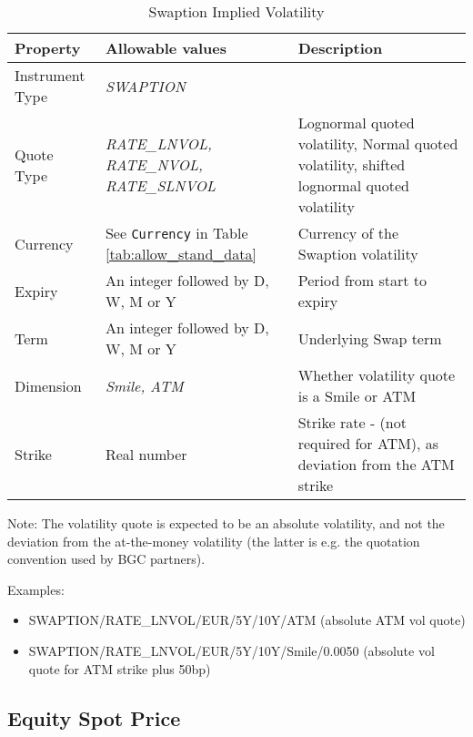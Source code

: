 \begin{table}[H]
\centering
  \begin{tabular}{|p{3cm}|p{3.5cm}|p{7cm}|}
    \hline
    {\bf Property} & {\bf Allowable values} & {\bf Description} \\ \hline
    Instrument Type & \emph{SWAPTION} & \\ \hline
    Quote Type & \emph{RATE\_LNVOL, RATE\_NVOL, RATE\_SLNVOL} & Lognormal quoted volatility, Normal quoted volatility, shifted lognormal quoted volatility\\ \hline
    Currency & See \lstinline!Currency! in Table \ref{tab:allow_stand_data}&  Currency of the Swaption volatility\\ \hline
    Expiry & An integer followed by D, W, M or Y & Period from start to expiry \\ \hline
    Term & An integer followed by D, W, M or Y & Underlying Swap term \\ \hline
    Dimension & \emph{Smile, ATM}  & Whether volatility quote is a Smile or ATM \\ \hline
    Strike & Real number & Strike rate - (not required for ATM), as deviation from the ATM strike\\ \hline
  \end{tabular}
  \caption{Swaption Implied Volatility}
  \label{tab:swaptimplvol_quote}
\end{table}


\medskip Note: The volatility quote is expected to be an absolute volatility, and not the deviation from the
at-the-money volatility (the latter is e.g. the quotation convention used by BGC partners).

\medskip
Examples:
\begin{itemize}
\item { SWAPTION/RATE\_LNVOL/EUR/5Y/10Y/ATM} (absolute ATM vol quote)
\item { SWAPTION/RATE\_LNVOL/EUR/5Y/10Y/Smile/0.0050} (absolute vol quote for ATM strike plus 50bp)
\end{itemize}

\subsection{Equity Spot Price}

